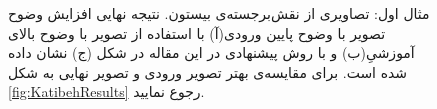 \documentclass[11pt,a4paper,twocolumn]{article}
\numberwithin{table}{section}
\begin{document}
\begin{figure}[tp]
\centering {}%
 \caption{مثال اول: تصاویری از نقش‌برجسته‌ی بیستون. نتیجه نهایی افزایش وضوح تصویر با وضوح پایین ورودی(آ) با استفاده از تصویر با وضوح بالای آموزشیِ(ب) و با روش پیشنهادی در این مقاله در شکل (ج) نشان داده شده است. برای مقایسه‌ی بهتر تصویر ورودی و تصویر نهایی به شکل \ref{fig:KatibehResults} رجوع نمایید.}
\label{fig:Katibeh}
\end{figure}
\end{document}
